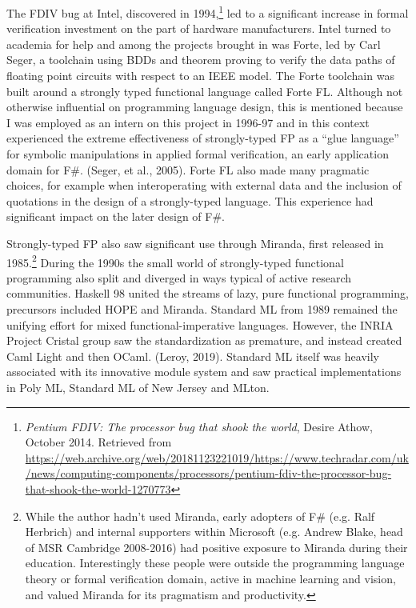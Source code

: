 \documentclass[acmsmall]{acmart}\settopmatter{}
\begin{document}
The FDIV bug at Intel, discovered in 1994,\footnote{\textit{Pentium FDIV: The processor bug that shook the world}, Desire Athow, October 2014. Retrieved
from \url{https://web.archive.org/web/20181123221019/https://www.techradar.com/uk/news/computing-components/processors/pentium-fdiv-the-processor-bug-that-shook-the-world-1270773}}  led to a
significant increase in formal verification investment on the part of hardware manufacturers. Intel turned to academia for help and among the projects brought
in was Forte, led by Carl Seger, a toolchain using BDDs and theorem proving to verify the data paths of floating point circuits with respect to an IEEE model.
The Forte toolchain was built around a strongly typed functional language called Forte FL. Although not otherwise influential on programming language design, this
is mentioned because I was employed as an intern on this project in 1996-97 and in this context experienced the extreme effectiveness of strongly-typed FP
as a “glue language” for symbolic manipulations in applied formal verification, an early application domain for F\#. (Seger, et al., 2005). Forte FL also made
many pragmatic choices, for example when interoperating with external data and the inclusion of quotations in the design of a strongly-typed language. This experience
had significant impact on the later design of F\#.

Strongly-typed FP also saw significant use through Miranda, first released in 1985.\footnote{While the author hadn’t used Miranda, early adopters of
F\# (e.g. Ralf Herbrich) and internal supporters within Microsoft (e.g. Andrew Blake, head of MSR Cambridge 2008-2016) had positive exposure to Miranda
during their education. Interestingly these people were outside the programming language theory or formal verification domain, active in machine learning and vision, and
valued Miranda for its pragmatism and productivity.}  During the 1990s the small world of strongly-typed functional programming also split and diverged in ways typical
of active research communities.  Haskell 98 united the streams of lazy, pure functional programming, precursors included HOPE and Miranda.  Standard ML from 1989 remained
the unifying effort for mixed functional-imperative languages. However, the INRIA Project Cristal group saw the standardization as premature, and instead created
Caml Light and then OCaml. (Leroy, 2019). Standard ML itself was heavily associated with its innovative module system and saw practical implementations in Poly ML, Standard
ML of New Jersey and MLton.
\end{document}
